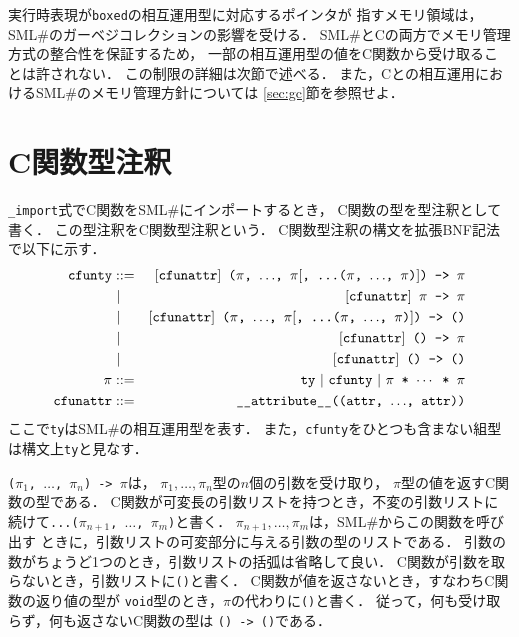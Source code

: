 \documentclass{jbook}
\newcommand{\smlsharp}{SML\#}
\newcommand{\vbar}{\mbox{\ $|$\ }}
\newcommand{\term}[1]{\mbox{{\tt #1}}}
\begin{document}
	実行時表現が{\tt boxed}の相互運用型に対応するポインタが
指すメモリ領域は，
\smlsharp{}のガーベジコレクションの影響を受ける．
	\smlsharp{}とCの両方でメモリ管理方式の整合性を保証するため，
一部の相互運用型の値をC関数から受け取ることは許されない．
	この制限の詳細は次節で述べる．
	また，Cとの相互運用における\smlsharp{}のメモリ管理方針については
\ref{sec:gc}節を参照せよ．

\section{C関数型注釈}

	{\tt \_import}式でC関数を\smlsharp{}にインポートするとき，
C関数の型を型注釈として書く．
	この型注釈をC関数型注釈という．
	C関数型注釈の構文を拡張BNF記法で以下に示す．
\begin{eqnarray*}
\term{cfunty}
&::=& \mbox{\tt $[\term{cfunattr}]$ ($\pi$, $\ldots$, $\pi$$[$, ...($\pi$, $\ldots$, $\pi$)$]$) -> $\pi$}
\\
&\vbar& \mbox{\tt $[\term{cfunattr}]$ $\pi$ -> $\pi$} \\
&\vbar& \mbox{\tt $[\term{cfunattr}]$ ($\pi$, $\ldots$, $\pi$$[$, ...($\pi$, $\ldots$, $\pi$)$]$) -> ()}\\
&\vbar& \mbox{\tt $[\term{cfunattr}]$ () -> $\pi$}\\
&\vbar& \mbox{\tt $[\term{cfunattr}]$ () -> ()}
\\
\pi
&::=& \term{ty}
\ |\  \term{cfunty}
\ |\  \mbox{\tt $\pi$ * $\cdots$ * $\pi$}
\\
\term{cfunattr}
&::=& \mbox{\tt \_\_attribute\_\_((\term{attr}, $\ldots$, \term{attr}))}
\end{eqnarray*}
	ここで\term{ty}は\smlsharp{}の相互運用型を表す．
	また，\term{cfunty}をひとつも含まない組型は構文上\term{ty}と見なす．

	{\tt ($\pi_1$, $\ldots$, $\pi_n$) -> $\pi$}は，
$\pi_1, \ldots, \pi_n$型の$n$個の引数を受け取り，
$\pi$型の値を返すC関数の型である．
	C関数が可変長の引数リストを持つとき，不変の引数リストに
続けて{\tt ...($\pi_{n+1}$, $\ldots$, $\pi_{m}$)}と書く．
	$\pi_{n+1}, \ldots, \pi_m$は，\smlsharp{}からこの関数を呼び出す
ときに，引数リストの可変部分に与える引数の型のリストである．
	引数の数がちょうど1つのとき，引数リストの括弧は省略して良い．
        C関数が引数を取らないとき，引数リストに{\tt ()}と書く．
	C関数が値を返さないとき，すなわちC関数の返り値の型が
{\tt void}型のとき，$\pi$の代わりに{\tt ()}と書く．
	従って，何も受け取らず，何も返さないC関数の型は
{\tt () -> ()}である．
\end{document}
